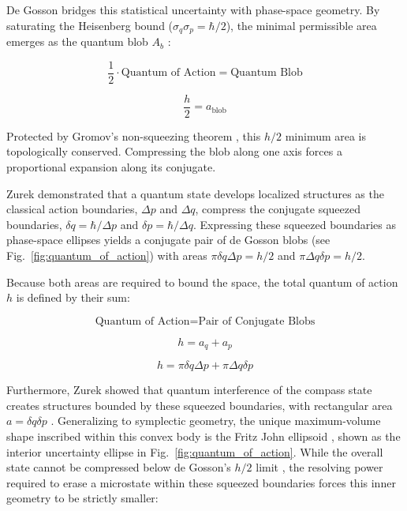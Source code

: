 \documentclass[%
  aps, reprint, prl, amsmath,amssymb
]{revtex4-2}
\begin{document}
De Gosson bridges this statistical uncertainty with phase-space geometry. By saturating the Heisenberg bound ($\sigma_q \sigma_p = \hbar/2$), the minimal permissible area emerges as the quantum blob $A_b$ \cite{DeGosson2003}:

\begin{equation}
\label{eq:SimpleLanguageOneBlob}
\frac{1}{2} \cdot \text{Quantum of Action} = \text{Quantum Blob}
\end{equation}

\begin{equation}
\label{eq:SymplecticCapacity}
\frac{h}{2} = a_{\text{blob}}
\end{equation}

Protected by Gromov's non-squeezing theorem \cite{Gromov1985}, this $h/2$ minimum area is topologically conserved. Compressing the blob along one axis forces a proportional expansion along its conjugate.

Zurek \cite{Zurek2001} demonstrated that a quantum state develops localized structures as the classical action boundaries, $\Delta p$ and $\Delta q$, compress the conjugate squeezed boundaries, $\delta q = \hbar / \Delta p$ and $\delta p = \hbar / \Delta q$. Expressing these squeezed boundaries as phase-space ellipses yields a conjugate pair of de Gosson blobs (see Fig.~\ref{fig:quantum_of_action}) with areas $\pi \delta q \Delta p = h/2$ and $\pi \Delta q \delta p = h/2$.

Because both areas are required to bound the space, the total quantum of action $h$ is defined by their sum:

\begin{equation}
\label{eq:SimpleLanguageBlobs}
\text{Quantum of Action} = \text{Pair of Conjugate Blobs}
\end{equation}

\begin{equation}
\label{eq:Blobs}
h = a_q + a_p
\end{equation}

\begin{equation}
\label{eq:BlobsArea}
h = \pi \delta q \Delta p + \pi \Delta q \delta p
\end{equation}

Furthermore, Zurek showed that quantum interference of the compass state creates structures bounded by these squeezed boundaries, with rectangular area $a = \delta q \delta p$ \cite{Zurek2001}. Generalizing to symplectic geometry, the unique maximum-volume shape inscribed within this convex body is the Fritz John ellipsoid \cite{John1948}, shown as the interior uncertainty ellipse in Fig.~\ref{fig:quantum_of_action}. While the overall state cannot be compressed below de Gosson's $h/2$ limit \cite{DeGosson2022}, the resolving power required to erase a microstate within these squeezed boundaries forces this inner geometry to be strictly smaller:
\end{document}
